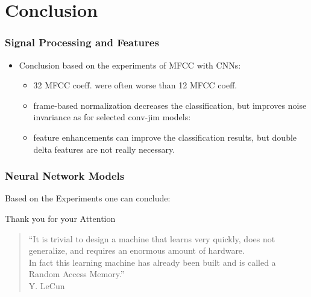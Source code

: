 
\section{Conclusion}
\begin{frame}
  \frametitle{Signal Processing and Features}
  \begin{itemize}
    \item Conclusion based on the experiments of MFCC with CNNs:
    \begin{itemize}
      \item 32 MFCC coeff. were often worse than 12 MFCC coeff.
      \item frame-based normalization decreases the classification, but improves noise invariance as for selected conv-jim models:
      \vspace{-0.5cm}
      \begin{figure}[!ht]
        \centering
        \qquad
      \end{figure}
      \item feature enhancements can improve the classification results, but double delta features are not really necessary.
    \end{itemize}
  \end{itemize}
\end{frame}


\begin{frame}
  \frametitle{Neural Network Models}
  Based on the Experiments one can conclude:
\end{frame}

\begin{frame}
  \Large
  \centering
  \vfill
  Thank you for your Attention
  \begin{quote}
    \scriptsize
    \vspace{1cm}
    \enquote{It is trivial to design a machine that learns very quickly, does not generalize, and requires an enormous amount of hardware.\\
    In fact this learning machine has already been built and is called a Random Access Memory.}\\
    \vspace{0.25cm}
    Y. LeCun
  \end{quote}
\end{frame}